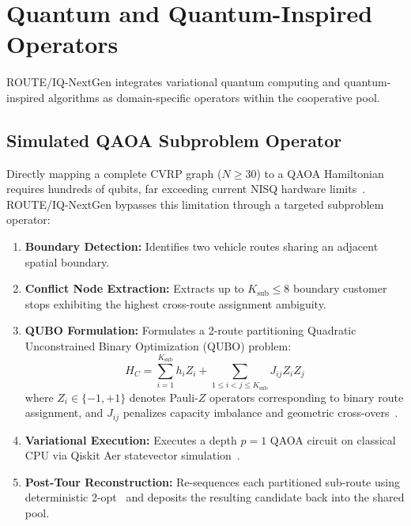 \section{Quantum and Quantum-Inspired Operators}
\label{sec:quantum_classical}
ROUTE/IQ-NextGen integrates variational quantum computing and quantum-inspired algorithms as domain-specific operators within the cooperative pool.

\subsection{Simulated QAOA Subproblem Operator}
Directly mapping a complete CVRP graph ($N \ge 30$) to a QAOA Hamiltonian requires hundreds of qubits, far exceeding current NISQ hardware limits~\cite{preskill2018quantum,mcclean2018barren}. ROUTE/IQ-NextGen bypasses this limitation through a targeted subproblem operator:
\begin{enumerate}
    \item \textbf{Boundary Detection:} Identifies two vehicle routes sharing an adjacent spatial boundary.
    \item \textbf{Conflict Node Extraction:} Extracts up to $K_{\text{sub}} \le 8$ boundary customer stops exhibiting the highest cross-route assignment ambiguity.
    \item \textbf{QUBO Formulation:} Formulates a 2-route partitioning Quadratic Unconstrained Binary Optimization (QUBO) problem:
    \begin{equation}
    H_C = \sum_{i=1}^{K_{\text{sub}}} h_i Z_i + \sum_{1 \le i < j \le K_{\text{sub}}} J_{ij} Z_i Z_j
    \end{equation}
    where $Z_i \in \{-1, +1\}$ denotes Pauli-$Z$ operators corresponding to binary route assignment, and $J_{ij}$ penalizes capacity imbalance and geometric cross-overs~\cite{lucas2014ising}.
    \item \textbf{Variational Execution:} Executes a depth $p=1$ QAOA circuit on classical CPU via Qiskit Aer statevector simulation~\cite{qiskit2024}.
    \item \textbf{Post-Tour Reconstruction:} Re-sequences each partitioned sub-route using deterministic 2-opt~\cite{croes1958method} and deposits the resulting candidate back into the shared pool.
\end{enumerate}

